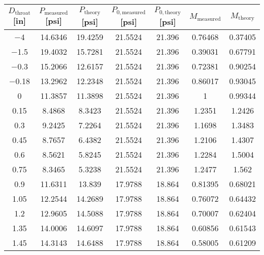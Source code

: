 \begin{tabular}{ccccccc}
\toprule
$D_\text{throat}$ [\unit{in}] & $P_\text{measured}$ [\unit{psi}] & $P_\text{theory}$ [\unit{psi}] & $P_{0,\text{measured}}$ [\unit{psi}] & $P_{0,\text{theory}}$ [\unit{psi}] & $M_\text{measured}$ & $M_\text{theory}$ \\
\midrule
\num{-4} & \num{14.6346} & \num{19.4259} & \num{21.5524} & \num{21.396} & \num{0.76468} & \num{0.37405} \\ 
\num{-1.5} & \num{19.4032} & \num{15.7281} & \num{21.5524} & \num{21.396} & \num{0.39031} & \num{0.67791} \\ 
\num{-0.3} & \num{15.2066} & \num{12.6157} & \num{21.5524} & \num{21.396} & \num{0.72381} & \num{0.90254} \\ 
\num{-0.18} & \num{13.2962} & \num{12.2348} & \num{21.5524} & \num{21.396} & \num{0.86017} & \num{0.93045} \\ 
\num{0} & \num{11.3857} & \num{11.3898} & \num{21.5524} & \num{21.396} & \num{1} & \num{0.99344} \\ 
\num{0.15} & \num{8.4868} & \num{8.3423} & \num{21.5524} & \num{21.396} & \num{1.2351} & \num{1.2426} \\ 
\num{0.3} & \num{9.2425} & \num{7.2264} & \num{21.5524} & \num{21.396} & \num{1.1698} & \num{1.3483} \\ 
\num{0.45} & \num{8.7657} & \num{6.4382} & \num{21.5524} & \num{21.396} & \num{1.2106} & \num{1.4307} \\ 
\num{0.6} & \num{8.5621} & \num{5.8245} & \num{21.5524} & \num{21.396} & \num{1.2284} & \num{1.5004} \\ 
\num{0.75} & \num{8.3465} & \num{5.3238} & \num{21.5524} & \num{21.396} & \num{1.2477} & \num{1.562} \\ 
\num{0.9} & \num{11.6311} & \num{13.839} & \num{17.9788} & \num{18.864} & \num{0.81395} & \num{0.68021} \\ 
\num{1.05} & \num{12.2544} & \num{14.2689} & \num{17.9788} & \num{18.864} & \num{0.76072} & \num{0.64432} \\ 
\num{1.2} & \num{12.9605} & \num{14.5088} & \num{17.9788} & \num{18.864} & \num{0.70007} & \num{0.62404} \\ 
\num{1.35} & \num{14.0006} & \num{14.6097} & \num{17.9788} & \num{18.864} & \num{0.60856} & \num{0.61543} \\ 
\num{1.45} & \num{14.3143} & \num{14.6488} & \num{17.9788} & \num{18.864} & \num{0.58005} & \num{0.61209} \\ 
\bottomrule
\end{tabular}